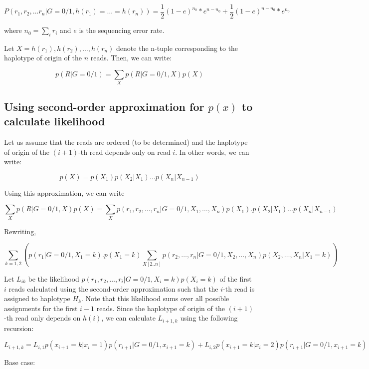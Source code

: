 \documentclass[9pt]{osa-supplemental-document}
\begin{document}
\begin{equation*}
P(r_1,r_2,\ldots r_n | G=0/1, h(r_1)=\ldots = h(r_n)) = \frac{1}{2}(1-e)^{n_0}*e^{n-n_0}   + \frac{1}{2}(1-e)^{n-n_0}*e^{n_0}
\end{equation*}

where $n_0 = \sum_i r_i$ and $e$ is the sequencing error rate.

Let $X = h(r_1),h(r_2),\ldots,h(r_n)$ denote the n-tuple corresponding to the haplotype of origin of the $n$ reads. Then, we can write: 

\[ 
p(R|G=0/1) = \sum_X p(R|G=0/1,X)p(X) 
\]


\subsection{Using second-order approximation for $p(x)$ to calculate likelihood}
Let us assume that the reads are ordered (to be determined) and the haplotype of origin of the $(i+1)$-th read depends only on read $i$. In other words, we can write: 

\[ p(X) = p(X_1) p(X_2|X_1) \ldots p(X_n|X_{n-1}) \]

Using this approximation, we can write

\[ 
 \sum_X p(R|G=0/1,X)p(X) = \sum_X p(r_1,r_2,\ldots,r_n|G=0/1,X_1,\ldots,X_n)p(X_1).p(X_2|X_1)\ldots p(X_n|X_{n-1})
\]

Rewriting,

\[
 \sum_{k=1,2} \left( p(r_1|G=0/1,X_1=k).p(X_1=k) \sum_{X[2..n]} p(r_2,\ldots,r_n|G=0/1,X_2,\ldots,X_n)p(X_2,\ldots,X_n|X_1=k) \right)
\]


Let $L_{ik}$ be the likelihood $p(r_1,r_2,\ldots,r_i|G=0/1,X_{i} = k)p(X_i=k)$ of the first $i$ reads calculated using the second-order approximation such that the $i$-th read is assigned to haplotype $H_k$. Note that this likelihood sums over all possible assignments for the first $i-1$ reads. Since the haplotype of origin of the $(i+1)$-th read only depends on $h(i)$, we can calculate $L_{i+1,k}$ using the following recursion: 

\[ L_{i+1,k} = L_{i,1} p(x_{i+1} = k | x_i = 1) p(r_{i+1}|G=0/1,x_{i+1} = k) + L_{i,2} p(x_{i+1} = k | x_i = 2)p(r_{i+1}|G=0/1,x_{i+1} = k) \] 

Base case:
\end{document}
